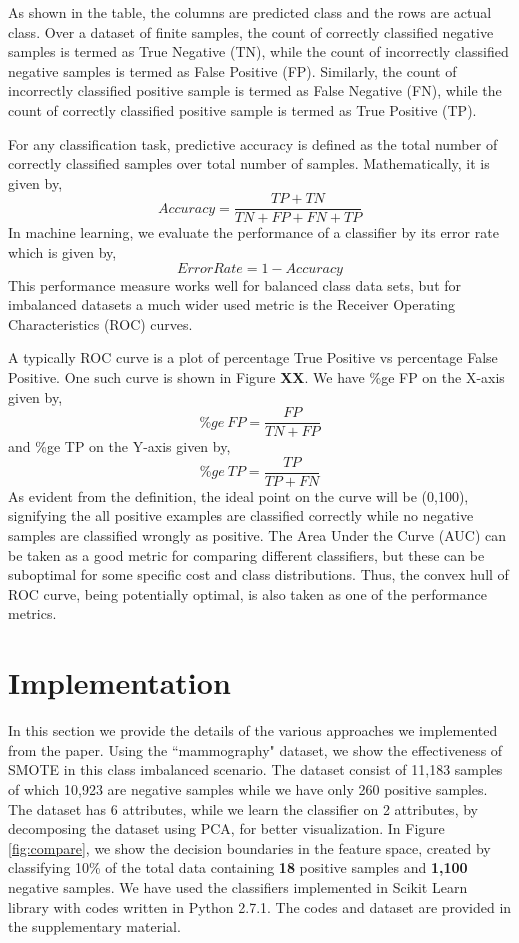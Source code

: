 \documentclass[10pt,journal,compsoc]{IEEEtran}
\begin{document}
As shown in the table, the columns are predicted class and the rows are actual class. 
Over a dataset of finite samples, the count of correctly classified negative samples is termed as True Negative (TN), while the count of incorrectly classified negative samples is termed as False Positive (FP).
Similarly, the count of incorrectly classified positive sample is termed as False Negative (FN), while the count of correctly classified positive sample is termed as True Positive (TP).

For any classification task, predictive accuracy is defined as the total number of correctly classified samples over total number of samples. 
Mathematically, it is given by, $$ Accuracy = \frac{TP + TN}{TN + FP + FN + TP}$$
In machine learning, we evaluate the performance of a classifier by its error rate which is given by, $$Error Rate = 1 - Accuracy$$
This performance measure works well for balanced class data sets, but for imbalanced datasets a much wider used metric is the Receiver Operating Characteristics (ROC) curves. 

A typically ROC curve is a plot of percentage True Positive vs percentage False Positive. 
One such curve is shown in Figure \textbf{XX}.
We have \%ge FP on the X-axis given by, $$\%ge~FP = \frac{FP}{TN + FP}$$
and \%ge TP on the Y-axis given by, $$\%ge~TP = \frac{TP}{TP + FN}$$
As evident from the definition, the ideal point on the curve will be (0,100), signifying the all positive examples are classified correctly while no negative samples are classified wrongly as positive.
The Area Under the Curve (AUC) can be taken as a good metric for comparing different classifiers, but these can be suboptimal for some specific cost and class distributions.
Thus, the convex hull of ROC curve, being potentially optimal, is also taken as one of the performance metrics.


\section{Implementation}

In this section we provide the details of the various approaches we implemented from the paper.
Using the ``mammography" dataset\cite{mammo}, we show the effectiveness of SMOTE in this class imbalanced scenario.
The dataset consist of 11,183 samples of which 10,923 are negative samples while we have only 260 positive samples.
The dataset has 6 attributes, while we learn the classifier on 2 attributes, by decomposing the dataset using PCA, for better visualization. 
In Figure \ref{fig:compare}, we show the decision boundaries in the feature space, created by classifying 10\% of the total data containing \textbf{18} positive samples and \textbf{1,100} negative samples.
We have used the classifiers implemented in Scikit Learn library\cite{sklearn} with codes written in Python 2.7.1.
The codes and dataset are provided in the supplementary material.
\end{document}
